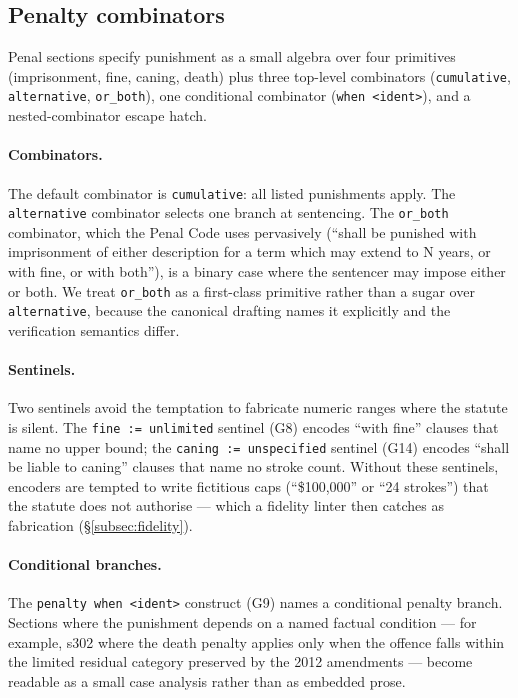 \subsection{Penalty combinators}
\label{subsec:penalty}
Penal sections specify punishment as a small algebra over four primitives
(imprisonment, fine, caning, death) plus three top-level combinators
(\texttt{cumulative}, \texttt{alternative}, \texttt{or\_both}), one
conditional combinator (\texttt{when <ident>}), and a nested-combinator
escape hatch.

\paragraph{Combinators.} The default combinator is \texttt{cumulative}:
all listed punishments apply. The \texttt{alternative} combinator
selects one branch at sentencing. The \texttt{or\_both} combinator,
which the Penal Code uses pervasively (``shall be punished with
imprisonment of either description for a term which may extend to N
years, or with fine, or with both''), is a binary case where the
sentencer may impose either or both. We treat \texttt{or\_both} as a
first-class primitive rather than a sugar over \texttt{alternative},
because the canonical drafting names it explicitly and the verification
semantics differ.

\paragraph{Sentinels.} Two sentinels avoid the temptation to fabricate
numeric ranges where the statute is silent. The \texttt{fine := unlimited}
sentinel (\textsf{G8}) encodes ``with fine'' clauses that name no upper
bound; the \texttt{caning := unspecified} sentinel (\textsf{G14})
encodes ``shall be liable to caning'' clauses that name no stroke count.
Without these sentinels, encoders are tempted to write fictitious caps
(``\$100,000'' or ``24 strokes'') that the statute does not authorise ---
which a fidelity linter then catches as fabrication
(\S\ref{subsec:fidelity}).

\paragraph{Conditional branches.} The \texttt{penalty when <ident>}
construct (\textsf{G9}) names a conditional penalty branch. Sections
where the punishment depends on a named factual condition --- for
example, s302 where the death penalty applies only when the offence
falls within the limited residual category preserved by the 2012
amendments --- become readable as a small case analysis rather than as
embedded prose.

